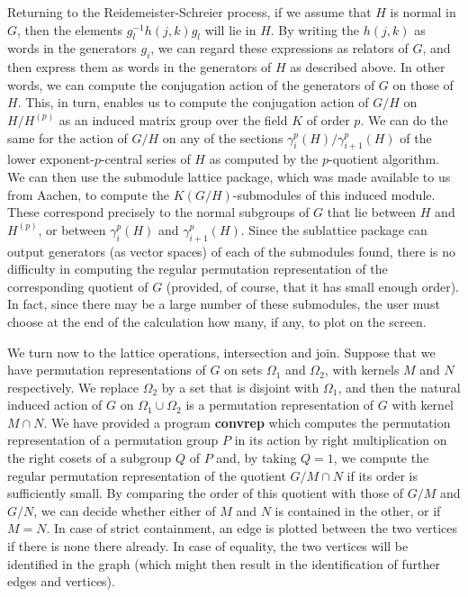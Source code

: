 Returning to the Reidemeister-Schreier process, if we assume that $H$ is
normal in $G$, then the elements $g_l^{-1}h(j,k)g_l$ will lie in $H$.
By writing the $h(j,k)$ as words in the generators $g_i$, we can
regard these expressions as relators of $G$, and then express them as words in
the generators of $H$ as described above. In other words, we can compute the
conjugation action of the generators of $G$ on those of $H$. This, in turn,
enables us to compute the conjugation action of $G/H$ on $H/H^{(p)}$ as
an induced matrix group
over the field $K$ of order $p$. We can do the same for the action
of $G/H$ on any of the sections $\gamma_{i}^{p}(H)/\gamma_{i+1}^{p}(H)$ of the
lower exponent-$p$-central series of $H$ as computed by the $p$-quotient
algorithm. We can then use the submodule lattice package, which was
made available to us from Aachen, to compute the $K(G/H)$-submodules of
this induced module. These correspond precisely to the normal subgroups of
$G$ that lie between $H$ and $H^{(p)}$, or between $\gamma_{i}^{p}(H)$ and
$\gamma_{i+1}^{p}(H)$. Since the sublattice package can output generators
(as vector spaces) of each of the submodules found, there is no difficulty
in computing the regular permutation representation of the corresponding
quotient of $G$ (provided, of course, that it has small enough order).
In fact, since there may be a large number of these submodules, the user must
choose at the end of the calculation how many, if any, to plot on the screen.

We turn now to the lattice operations, intersection and join. Suppose that
we have permutation representations of $G$ on sets $\Omega_1$ and
$\Omega_2$, with kernels $M$ and $N$ respectively.
We replace $\Omega_2$ by a set that is
disjoint with $\Omega_1$, and then the natural induced action of $G$ on
$\Omega_1 \cup \Omega_2$ is a permutation representation of $G$ with kernel
$M \cap N$. We have provided a program {\bf convrep} which computes the
permutation representation of a permutation group $P$ in its action by right
multiplication on the right cosets of a subgroup $Q$ of $P$ and, by taking
$Q = 1$, we compute the regular permutation representation of the
quotient $G/M \cap N$ if its order is sufficiently small.
By comparing the order of this quotient with those of $G/M$ and $G/N$, we
can decide whether either of $M$ and $N$ is contained in the other, or
if $M = N$. In case of strict containment, an edge is plotted between the two
vertices if there is none there already. In case of equality, the two
vertices will be identified in the graph
(which might then result in the identification of further edges and vertices).

